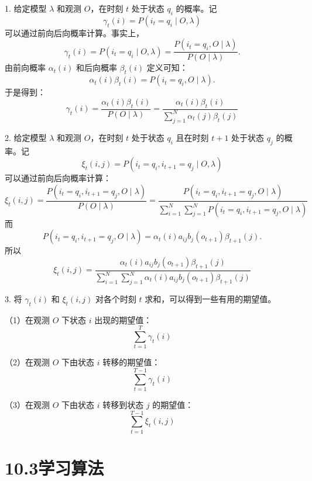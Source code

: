 \documentclass[UTF8,12pt,a4paper,fontset=fandol]{ctexart}
\begin{document}
1. 给定模型 $\lambda$ 和观测 $O$，在时刻 $t$ 处于状态 $q_i$ 的概率。记
\begin{equation}
  \gamma_t(i)=P(i_t=q_i\mid O,\lambda)
  \tag{10.23}
\end{equation}
可以通过前向后向概率计算。事实上，
\[
  \gamma_t(i)=P(i_t=q_i\mid O,\lambda)=\frac{P(i_t=q_i,O\mid\lambda)}{P(O\mid\lambda)}.
\]
由前向概率 $\alpha_t(i)$ 和后向概率 $\beta_t(i)$ 定义可知：
\[
  \alpha_t(i)\beta_t(i)=P(i_t=q_i,O\mid\lambda).
\]
于是得到：
\begin{equation}
  \gamma_t(i)=\frac{\alpha_t(i)\beta_t(i)}{P(O\mid\lambda)}
  =\frac{\alpha_t(i)\beta_t(i)}{\sum_{j=1}^N\alpha_t(j)\beta_t(j)}
  \tag{10.24}
\end{equation}

2. 给定模型 $\lambda$ 和观测 $O$，在时刻 $t$ 处于状态 $q_i$ 且在时刻 $t+1$ 处于状态 $q_j$ 的概率。记
\begin{equation}
  \xi_t(i,j)=P(i_t=q_i,i_{t+1}=q_j\mid O,\lambda)
  \tag{10.25}
\end{equation}
可以通过前向后向概率计算：
\[
  \xi_t(i,j)=\frac{P(i_t=q_i,i_{t+1}=q_j,O\mid\lambda)}{P(O\mid\lambda)}
  =\frac{P(i_t=q_i,i_{t+1}=q_j,O\mid\lambda)}
  {\sum_{i=1}^N\sum_{j=1}^N P(i_t=q_i,i_{t+1}=q_j,O\mid\lambda)}
\]
而
\[
  P(i_t=q_i,i_{t+1}=q_j,O\mid\lambda)=\alpha_t(i)a_{ij}b_j(o_{t+1})\beta_{t+1}(j).
\]
所以
\begin{equation}
  \xi_t(i,j)=
  \frac{\alpha_t(i)a_{ij}b_j(o_{t+1})\beta_{t+1}(j)}
  {\sum_{i=1}^N\sum_{j=1}^N\alpha_t(i)a_{ij}b_j(o_{t+1})\beta_{t+1}(j)}
  \tag{10.26}
\end{equation}

3. 将 $\gamma_t(i)$ 和 $\xi_t(i,j)$ 对各个时刻 $t$ 求和，可以得到一些有用的期望值。

（1）在观测 $O$ 下状态 $i$ 出现的期望值：
\begin{equation}
  \sum_{t=1}^T \gamma_t(i)
  \tag{10.27}
\end{equation}

（2）在观测 $O$ 下由状态 $i$ 转移的期望值：
\begin{equation}
  \sum_{t=1}^{T-1}\gamma_t(i)
  \tag{10.28}
\end{equation}

（3）在观测 $O$ 下由状态 $i$ 转移到状态 $j$ 的期望值：
\begin{equation}
  \sum_{t=1}^{T-1}\xi_t(i,j)
  \tag{10.29}
\end{equation}

\section*{10.3\quad 学习算法}
\end{document}
